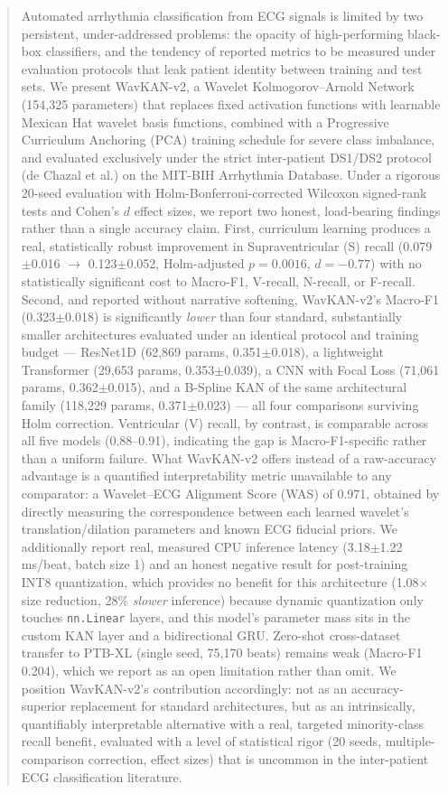 \documentclass[journal,twoside,web]{ieeecolor}
\begin{document}
\begin{abstract}
Automated arrhythmia classification from ECG signals is limited by two persistent, under-addressed problems: the opacity of high-performing black-box classifiers, and the tendency of reported metrics to be measured under evaluation protocols that leak patient identity between training and test sets. We present WavKAN-v2, a Wavelet Kolmogorov--Arnold Network (154,325 parameters) that replaces fixed activation functions with learnable Mexican Hat wavelet basis functions, combined with a Progressive Curriculum Anchoring (PCA) training schedule for severe class imbalance, and evaluated exclusively under the strict inter-patient DS1/DS2 protocol (de Chazal et al.) on the MIT-BIH Arrhythmia Database. Under a rigorous 20-seed evaluation with Holm-Bonferroni-corrected Wilcoxon signed-rank tests and Cohen's $d$ effect sizes, we report two honest, load-bearing findings rather than a single accuracy claim. First, curriculum learning produces a real, statistically robust improvement in Supraventricular (S) recall (0.079$\pm$0.016 $\to$ 0.123$\pm$0.052, Holm-adjusted $p=0.0016$, $d=-0.77$) with no statistically significant cost to Macro-F1, V-recall, N-recall, or F-recall. Second, and reported without narrative softening, WavKAN-v2's Macro-F1 (0.323$\pm$0.018) is significantly \emph{lower} than four standard, substantially smaller architectures evaluated under an identical protocol and training budget --- ResNet1D (62,869 params, 0.351$\pm$0.018), a lightweight Transformer (29,653 params, 0.353$\pm$0.039), a CNN with Focal Loss (71,061 params, 0.362$\pm$0.015), and a B-Spline KAN of the same architectural family (118,229 params, 0.371$\pm$0.023) --- all four comparisons surviving Holm correction. Ventricular (V) recall, by contrast, is comparable across all five models (0.88--0.91), indicating the gap is Macro-F1-specific rather than a uniform failure. What WavKAN-v2 offers instead of a raw-accuracy advantage is a quantified interpretability metric unavailable to any comparator: a Wavelet--ECG Alignment Score (WAS) of 0.971, obtained by directly measuring the correspondence between each learned wavelet's translation/dilation parameters and known ECG fiducial priors. We additionally report real, measured CPU inference latency (3.18$\pm$1.22 ms/beat, batch size 1) and an honest negative result for post-training INT8 quantization, which provides no benefit for this architecture (1.08$\times$ size reduction, 28\% \emph{slower} inference) because dynamic quantization only touches \texttt{nn.Linear} layers, and this model's parameter mass sits in the custom KAN layer and a bidirectional GRU. Zero-shot cross-dataset transfer to PTB-XL (single seed, 75,170 beats) remains weak (Macro-F1 0.204), which we report as an open limitation rather than omit. We position WavKAN-v2's contribution accordingly: not as an accuracy-superior replacement for standard architectures, but as an intrinsically, quantifiably interpretable alternative with a real, targeted minority-class recall benefit, evaluated with a level of statistical rigor (20 seeds, multiple-comparison correction, effect sizes) that is uncommon in the inter-patient ECG classification literature.
\end{abstract}
\end{document}
